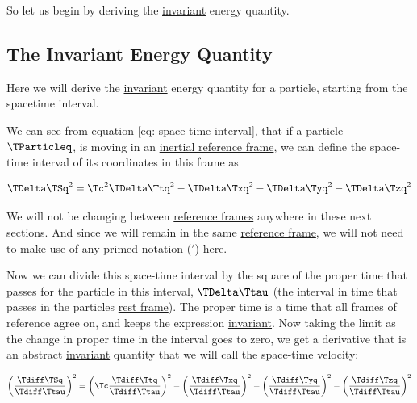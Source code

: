 So let us begin by deriving the \hyperlink{def-lorentz-invariant}{invariant} energy quantity.

\subsection{The Invariant Energy Quantity}\label{subsect: The Invariant Energy Quantity}

Here we will derive the \hyperlink{def-lorentz-invariant}{invariant} energy quantity for a particle, starting from the spacetime interval.

\begin{derivation}

	We can see from equation \eqref{eq: space-time interval}, that if a particle $\TParticleq $, is moving in an \hyperlink{def-Inertial-reference-frame}{inertial reference frame}, we can define the space-time interval of its coordinates in this frame as

	\begin{equation}
		\TDelta  \TSq ^2 = \Tc ^2\TDelta  \Ttq ^2 - \TDelta  \Txq ^2 - \TDelta  \Tyq ^2- \TDelta  \Tzq ^2
	\end{equation}

	We will not be changing between \hyperlink{def-Reference-frame}{reference frames} anywhere in these next sections.
	And since we will remain in the same \hyperlink{def-Reference-frame}{reference frame}, we will not need to make use of any primed notation ($'$) here.

	Now we can divide this space-time interval by the square of the proper time that passes for the particle in this interval, ${\TDelta \Ttau }$ (the interval in time that passes in the particles \hyperlink{def-proper-frame}{rest frame}).
	The proper time is a time that all frames of reference agree on, and keeps the expression \hyperlink{def-lorentz-invariant}{invariant}.
	Now taking the limit as the change in proper time in the interval goes to zero, we get a derivative that is an abstract \hyperlink{def-lorentz-invariant}{invariant} quantity that we will call the space-time velocity:

	\begin{equation}
		\left(\frac{\Tdiff \TSq }{\Tdiff \Ttau }\right)^2 = \left(\Tc \frac{ { \Tdiff \Ttq  } }{\Tdiff \Ttau }\right)^2-\left(\frac{\Tdiff \Txq }{\Tdiff \Ttau }\right)^2-\left(\frac{\Tdiff \Tyq }{\Tdiff \Ttau }\right)^2-\left(\frac{\Tdiff \Tzq }{\Tdiff \Ttau }\right)^2
	\end{equation}


\end{derivation}
